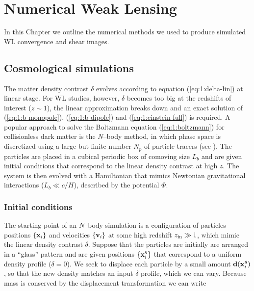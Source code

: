 
\chapter{Numerical Weak Lensing}
\lhead[\fancyplain{}{\thepage}]{\fancyplain{}{\rightmark}}
 \thispagestyle{plain}
\setlength{\parindent}{10mm}

\label{chp:3}
In this Chapter we outline the numerical methods we used to produce simulated WL convergence and shear images. 


\section{Cosmological simulations}
The matter density contrast $\delta$ evolves according to equation (\ref{eq:1:delta-lin}) at linear stage. For WL studies, however, $\delta$ becomes too big at the redshifts of interest ($z\sim 1$), the linear approximation breaks down and an exact solution of (\ref{eq:1:b-monopole}), (\ref{eq:1:b-dipole}) and (\ref{eq:1:einstein-full}) is required. A popular approach to solve the Boltzmann equation (\ref{eq:1:boltzmann}) for collisionless dark matter is the $N$--body method, in which phase space is discretized using a large but finite number $N_p$ of particle tracers (see \citep{gadget2}). The particles are placed in a cubical periodic box of comoving size $L_b$ and are given initial conditions that correspond to the linear density contrast at high $z$. The system is then evolved with a Hamiltonian that mimics Newtonian gravitational interactions ($L_b\ll c/H$), described by the potential $\Phi$.  

\subsection{Initial conditions}
The starting point of an $N$--body simulation is a configuration of particles positions $\{\mathbf{x}_i\}$ and velocities $\{\mathbf{v}_i\}$ at some high redshift $z_{\rm in}\gg 1$, which mimic the linear density contrast $\delta$. Suppose that the particles are initially are arranged in a ``glass'' pattern and are given positions $\{\mathbf{x}_i^g\}$ that correspond to a uniform density profile ($\delta=0$). We seek to displace each particle by a small amount $\mathbf{d}(\mathbf{x}_i^g)$, so that the new density matches an input $\delta$ profile, which we can vary. Because mass is conserved by the displacement transformation we can write

